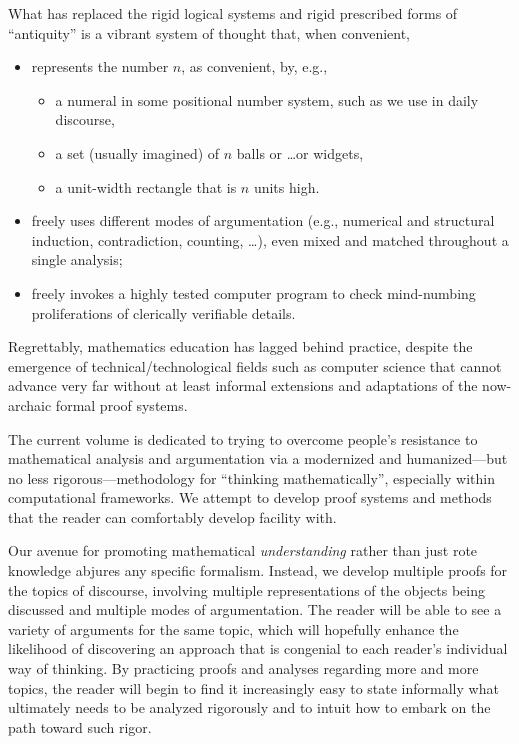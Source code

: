 \noindent
What has replaced the rigid logical systems and rigid prescribed forms
of ``antiquity'' is a vibrant system of thought that, when convenient,
\begin{itemize}
\item
represents the  number $n$, as convenient, by, e.g.,
  \begin{itemize}
  \item
a numeral in some positional number system, such as we use in daily
discourse,
  \item
a set (usually imagined) of $n$ balls or \ldots or widgets,
  \item
a unit-width rectangle that is $n$ units high.
  \end{itemize}

\item
freely uses different modes of argumentation (e.g., numerical and
structural induction, contradiction, counting, \ldots), even mixed and
matched throughout a single analysis;

\item
freely invokes a highly tested computer program to check mind-numbing
proliferations of clerically verifiable details.
\end{itemize}

Regrettably, mathematics education has lagged behind practice, despite
the emergence of technical/technological fields such as computer
science that cannot advance very far without at least informal
extensions and adaptations of the now-archaic formal proof systems.

The current volume is dedicated to trying to overcome people's
resistance to mathematical analysis and argumentation via a modernized
and humanized---but no less rigorous---methodology for ``thinking
mathematically'', especially within computational frameworks.  We
attempt to develop proof systems and methods that the reader can
comfortably develop facility with.

Our avenue for promoting mathematical {\em understanding} rather than
just rote knowledge abjures any specific formalism.  Instead, we
develop multiple proofs for the topics of discourse, involving
multiple representations of the objects being discussed and multiple
modes of argumentation.  The reader will be able to see a variety of
arguments for the same topic, which will hopefully enhance the
likelihood of discovering an approach that is congenial to each
reader's individual way of thinking.  By practicing proofs and
analyses regarding more and more topics, the reader will begin to find
it increasingly easy to state informally what ultimately needs to be
analyzed rigorously and to intuit how to embark on the path toward
such rigor.


